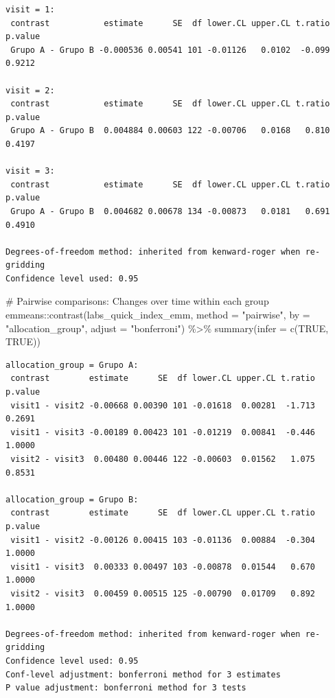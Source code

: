 \documentclass[
  12pt,
]{article}
\newenvironment{Shaded}{\begin{snugshade}}{\end{snugshade}}
\newcommand{\AttributeTok}[1]{\textcolor[rgb]{0.40,0.45,0.13}{#1}}
\newcommand{\CommentTok}[1]{\textcolor[rgb]{0.37,0.37,0.37}{#1}}
\newcommand{\ConstantTok}[1]{\textcolor[rgb]{0.56,0.35,0.01}{#1}}
\newcommand{\FunctionTok}[1]{\textcolor[rgb]{0.28,0.35,0.67}{#1}}
\newcommand{\NormalTok}[1]{\textcolor[rgb]{0.00,0.23,0.31}{#1}}
\newcommand{\SpecialCharTok}[1]{\textcolor[rgb]{0.37,0.37,0.37}{#1}}
\newcommand{\StringTok}[1]{\textcolor[rgb]{0.13,0.47,0.30}{#1}}
\begin{document}
\begin{verbatim}
visit = 1:
 contrast           estimate      SE  df lower.CL upper.CL t.ratio p.value
 Grupo A - Grupo B -0.000536 0.00541 101 -0.01126   0.0102  -0.099  0.9212

visit = 2:
 contrast           estimate      SE  df lower.CL upper.CL t.ratio p.value
 Grupo A - Grupo B  0.004884 0.00603 122 -0.00706   0.0168   0.810  0.4197

visit = 3:
 contrast           estimate      SE  df lower.CL upper.CL t.ratio p.value
 Grupo A - Grupo B  0.004682 0.00678 134 -0.00873   0.0181   0.691  0.4910

Degrees-of-freedom method: inherited from kenward-roger when re-gridding 
Confidence level used: 0.95 
\end{verbatim}

\begin{Shaded}
\begin{Highlighting}[]
\CommentTok{\# Pairwise comparisons: Changes over time within each group}
\NormalTok{emmeans}\SpecialCharTok{::}\FunctionTok{contrast}\NormalTok{(labs\_quick\_index\_emm,}
\AttributeTok{method =} \StringTok{"pairwise"}\NormalTok{, }\AttributeTok{by =} \StringTok{"allocation\_group"}\NormalTok{,}
\AttributeTok{adjust =} \StringTok{"bonferroni"}\NormalTok{) }\SpecialCharTok{\%\textgreater{}\%} \FunctionTok{summary}\NormalTok{(}\AttributeTok{infer =} \FunctionTok{c}\NormalTok{(}\ConstantTok{TRUE}\NormalTok{, }\ConstantTok{TRUE}\NormalTok{))}
\end{Highlighting}
\end{Shaded}

\begin{verbatim}
allocation_group = Grupo A:
 contrast        estimate      SE  df lower.CL upper.CL t.ratio p.value
 visit1 - visit2 -0.00668 0.00390 101 -0.01618  0.00281  -1.713  0.2691
 visit1 - visit3 -0.00189 0.00423 101 -0.01219  0.00841  -0.446  1.0000
 visit2 - visit3  0.00480 0.00446 122 -0.00603  0.01562   1.075  0.8531

allocation_group = Grupo B:
 contrast        estimate      SE  df lower.CL upper.CL t.ratio p.value
 visit1 - visit2 -0.00126 0.00415 103 -0.01136  0.00884  -0.304  1.0000
 visit1 - visit3  0.00333 0.00497 103 -0.00878  0.01544   0.670  1.0000
 visit2 - visit3  0.00459 0.00515 125 -0.00790  0.01709   0.892  1.0000

Degrees-of-freedom method: inherited from kenward-roger when re-gridding 
Confidence level used: 0.95 
Conf-level adjustment: bonferroni method for 3 estimates 
P value adjustment: bonferroni method for 3 tests 
\end{verbatim}
\end{document}
